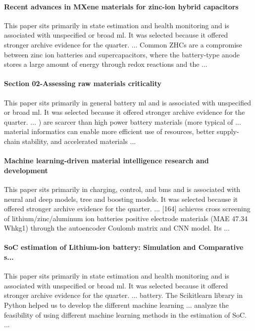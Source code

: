 \documentclass[conference]{IEEEtran}
\begin{document}
\paragraph{Recent advances in MXene materials for zinc-ion hybrid capacitors} This paper sits primarily in state estimation and health monitoring and is associated with unspecified or broad ml. It was selected because it offered stronger archive evidence for the quarter. ... Common ZHCs are a compromise between zinc ion batteries and supercapacitors, where the battery-type anode stores a large amount of energy through redox reactions and the ... \cite{recentadvancesin2025}

\paragraph{Section 02-Assessing raw materials criticality} This paper sits primarily in general battery ml and is associated with unspecified or broad ml. It was selected because it offered stronger archive evidence for the quarter. ... ) are scarcer than high power battery materials (more typical of ... material informatics can enable more efficient use of resources, better supply-chain stability, and accelerated materials ... \cite{section02assessingna}

\paragraph{Machine learning-driven material intelligence research and development} This paper sits primarily in charging, control, and bms and is associated with neural and deep models, tree and boosting models. It was selected because it offered stronger archive evidence for the quarter. ... [164] achieves cross screening of lithium/zinc/aluminum ion batteries positive electrode materials (MAE 47.34 Whkg1) through the autoencoder Coulomb matrix and CNN model. Its ... \cite{machinelearningdriven2025}

\paragraph{SoC estimation of Lithium-ion battery: Simulation and Comparative s...} This paper sits primarily in state estimation and health monitoring and is associated with unspecified or broad ml. It was selected because it offered stronger archive evidence for the quarter. ... battery. The Scikitlearn library in Python helped us to develop the different machine learning ... analyze the feasibility of using different machine learning methods in the estimation of SoC. ... \cite{socestimationof2023}
\end{document}
